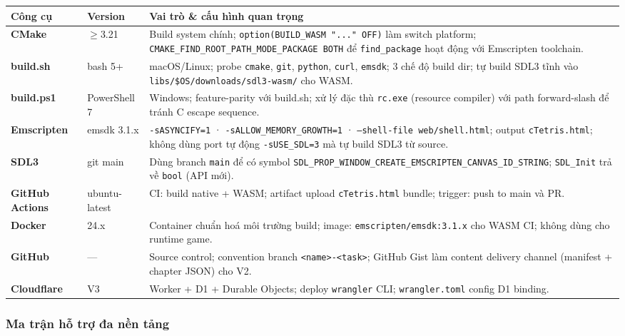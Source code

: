 \documentclass[12pt,a4paper]{article}
\begin{document}
\begin{tabularx}{\linewidth}{|l|l|X|}
  \hline
  \textbf{Công cụ} & \textbf{Version} & \textbf{Vai trò \& cấu hình quan trọng} \\
  \hline
  \textbf{CMake}         & $\geq$3.21  & Build system chính; \texttt{option(BUILD\_WASM "..." OFF)} làm switch platform; \texttt{CMAKE\_FIND\_ROOT\_PATH\_MODE\_PACKAGE BOTH} để \texttt{find\_package} hoạt động với Emscripten toolchain. \\
  \hline
  \textbf{build.sh}      & bash 5+     & macOS/Linux; probe \texttt{cmake}, \texttt{git}, \texttt{python}, \texttt{curl}, \texttt{emsdk}; 3 chế độ build dir; tự build SDL3 tĩnh vào \texttt{libs/\$OS/downloads/sdl3-wasm/} cho WASM. \\
  \hline
  \textbf{build.ps1}     & PowerShell 7& Windows; feature-parity với build.sh; xử lý đặc thù \texttt{rc.exe} (resource compiler) với path forward-slash để tránh C escape sequence. \\
  \hline
  \textbf{Emscripten}    & emsdk 3.1.x & \texttt{-sASYNCIFY=1} · \texttt{-sALLOW\_MEMORY\_GROWTH=1} · \texttt{--shell-file web/shell.html}; output \texttt{cTetris.html}; không dùng port tự động \texttt{-sUSE\_SDL=3} mà tự build SDL3 từ source. \\
  \hline
  \textbf{SDL3}          & git main     & Dùng branch \texttt{main} để có symbol \texttt{\scriptsize SDL\_PROP\_WINDOW\_CREATE\_}\allowbreak\texttt{\scriptsize EMSCRIPTEN\_CANVAS\_ID\_STRING}; \texttt{SDL\_Init} trả về \texttt{bool} (API mới). \\
  \hline
  \textbf{GitHub Actions}& ubuntu-latest& CI: build native + WASM; artifact upload \texttt{cTetris.html} bundle; trigger: push to main và PR. \\
  \hline
  \textbf{Docker}        & 24.x         & Container chuẩn hoá môi trường build; image: \texttt{emscripten/emsdk:3.1.x} cho WASM CI; không dùng cho runtime game. \\
  \hline
  \textbf{GitHub}        & ---          & Source control; convention branch \texttt{<name>-<task>}; GitHub Gist làm content delivery channel (manifest + chapter JSON) cho V2. \\
  \hline
  \textbf{Cloudflare}    & V3           & Worker + D1 + Durable Objects; deploy \texttt{wrangler} CLI; \texttt{wrangler.toml} config D1 binding. \\
  \hline
\end{tabularx}

\subsubsection{Ma trận hỗ trợ đa nền tảng}
\end{document}
